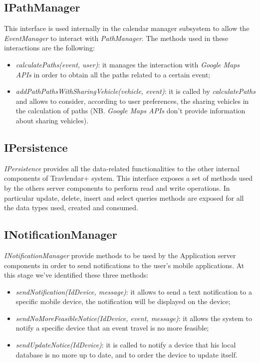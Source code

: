 \subsection{IPathManager}
This interface is used internally in the calendar manager subsystem to allow the \textit{EventManager} to interact with \textit{PathManager}. The methods used in these interactions are the following:
\begin{itemize}
\item \textit{calculatePaths(event, user)}: it manages the interaction with \textit{Google Maps APIs} in order to obtain all the paths related to a certain event;
\item \textit{addPathPathsWithSharingVehicle(vehicle, event)}: it is called by \textit{calculatePaths} and allows to consider, according to user preferences, the sharing vehicles in the calculation of paths (NB. \textit{Google Maps APIs} don't provide information about sharing vehicles). 
\end{itemize}

\subsection{IPersistence}
\label{subsect:IPersistence}
\textit{IPersistence} provides all the data-related functionalities to the other internal components of Travlendar+ system. This interface exposes a set of methods used by the others server components to perform read and write operations. In particular update, delete, insert and select queries methods are exposed for all the data types used, created and consumed.

\subsection{INotificationManager}
\label{subsect:INotificationManager}
\textit{INotificationManager} provide methods to be used by the Application server components in order to send notifications to the user's mobile applications. At this stage we've identified these three methods:
\begin{itemize}
	\item \textit{sendNotification(IdDevice, message)}: it allows to send a text notification to a specific mobile device, the notification will be displayed on the device;
	\item \textit{sendNoMoreFeasibleNotice(IdDevice, event, message)}: it allows the system to notify a specific device that an event travel is no more feasible;
	\item \textit{sendUpdateNotice(IdDevice)}: it is called to notify a device that his local database is no more up to date, and to order the device to update itself.
\end{itemize}

